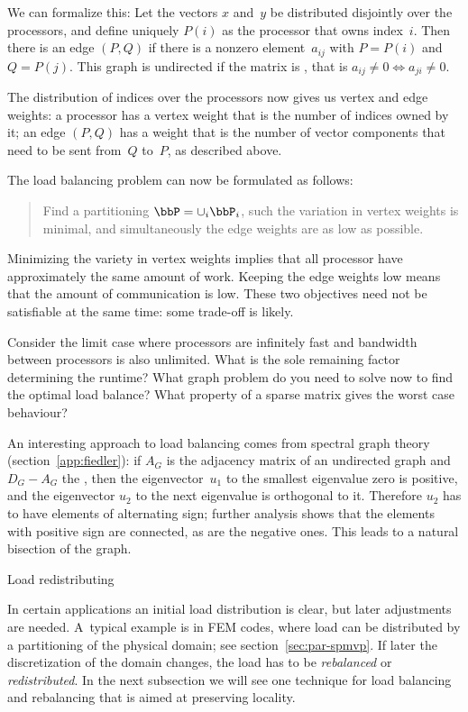 We can formalize this: Let the vectors $x$ and~$y$ be distributed
disjointly over the processors, and define uniquely $P(i)$ as the
processor that owns index~$i$. Then there is an edge $(P,Q)$ if there
is a nonzero element~$a_{ij}$ with $P=P(i)$ and $Q=P(j)$. This graph
is undirected if the matrix is ,
that is $a_{ij}\not=0\Leftrightarrow a_{ji}\not=0$.

The distribution of indices over the processors now gives us vertex
and edge weights: a processor has a vertex weight that is the number
of indices owned by it; an edge $(P,Q)$ has a weight that is the number of
vector components that need to be sent from~$Q$ to~$P$, as described above.

The load balancing problem can now be formulated as
follows:
\begin{quote}
  Find a partitioning $\bbP=\cup_i \bbP_i$, such the variation in
  vertex weights is minimal, and simultaneously the edge weights are
  as low as possible.
\end{quote}
Minimizing the variety in vertex weights implies that all processor
have approximately the same amount of work. Keeping the edge weights
low means that the amount of communication is low. These two
objectives need not be satisfiable at the same time: some trade-off is
likely. 

\begin{exercise}
  Consider the limit case where processors are infinitely fast and
  bandwidth between processors is also unlimited. What is the sole
  remaining factor determining the runtime? What graph problem do you
  need to solve now to find the optimal load balance? What property of
  a sparse matrix gives the worst case behaviour?
\end{exercise}

An interesting approach to load balancing comes from spectral graph
theory (section~\ref{app:fiedler}): if $A_G$ is the adjacency matrix
of an undirected graph and $D_G-A_G$ the ,
then the eigenvector~$u_1$ to the smallest eigenvalue zero is
positive, and the eigenvector $u_2$ to the next eigenvalue is
orthogonal to it. Therefore $u_2$ has to have elements of alternating
sign; further analysis shows that the elements with positive sign are
connected, as are the negative ones. This leads to a natural bisection
of the graph.

 {Load redistributing}

In certain applications an initial load distribution is clear, but
later adjustments are needed. A~typical example is in \ac{FEM} codes,
where load can be distributed by a partitioning of the physical
domain; see section~\ref{sec:par-spmvp}. If later the discretization
of the domain changes, the load has to be
\emph{rebalanced} or
\emph{redistributed}. In the next
subsection we will see one technique for load balancing and
rebalancing that is aimed at preserving locality.

